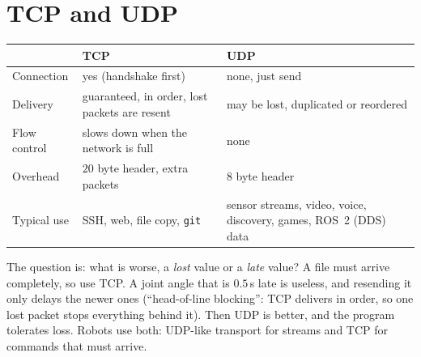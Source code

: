 \section*{TCP and UDP}
\begin{center}
\renewcommand{\arraystretch}{1.25}
\begin{tabular}{p{3.2cm}p{4.8cm}p{4.8cm}}
 & \textbf{TCP} & \textbf{UDP}\\ \hline
Connection & yes (handshake first) & none, just send\\
Delivery & guaranteed, in order, lost packets are resent & may be lost, duplicated or reordered\\
Flow control & slows down when the network is full & none\\
Overhead & $20$ byte header, extra packets & $8$ byte header\\
Typical use & SSH, web, file copy, \texttt{git} & sensor streams, video, voice, discovery, games, ROS~2 (DDS) data\\
\end{tabular}
\end{center}
The question is: what is worse, a \emph{lost} value or a \emph{late} value? A file must arrive completely, so use TCP. A joint angle that is $0.5$\,s late is useless, and resending it only delays the newer ones (``head-of-line blocking'': TCP delivers in order, so one lost packet stops everything behind it). Then UDP is better, and the program tolerates loss. Robots use both: UDP-like transport for streams and TCP for commands that must arrive.

